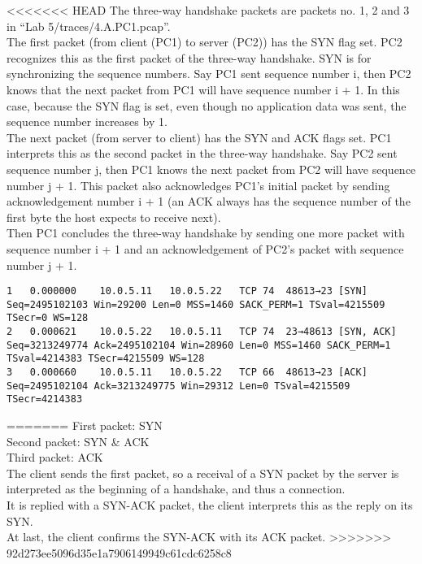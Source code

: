 <<<<<<< HEAD
The three-way handshake packets are packets no. 1, 2 and 3 in ``Lab 5/traces/4.A.PC1.pcap''. \\
The first packet (from client (PC1) to server (PC2)) has the SYN flag set. PC2 recognizes this as the first packet of the three-way handshake. SYN is for synchronizing the sequence numbers. Say PC1 sent sequence number i, then PC2 knows that the next packet from PC1 will have sequence number i + 1. In this case, because the SYN flag is set, even though no application data was sent, the sequence number increases by 1. \\
The next packet (from server to client) has the SYN and ACK flags set. PC1 interprets this as the second packet in the three-way handshake. Say PC2 sent sequence number j, then PC1 knows the next packet from PC2 will have sequence number j + 1. This packet also acknowledges PC1's initial packet by sending acknowledgement number i + 1 (an ACK always has the sequence number of the first byte the host expects to receive next). \\
Then PC1 concludes the three-way handshake by sending one more packet with sequence number i + 1 and an acknowledgement of PC2's packet with sequence number j + 1.

\begin{lstlisting}
1	0.000000	10.0.5.11	10.0.5.22	TCP	74	48613→23 [SYN] Seq=2495102103 Win=29200 Len=0 MSS=1460 SACK_PERM=1 TSval=4215509 TSecr=0 WS=128
2	0.000621	10.0.5.22	10.0.5.11	TCP	74	23→48613 [SYN, ACK] Seq=3213249774 Ack=2495102104 Win=28960 Len=0 MSS=1460 SACK_PERM=1 TSval=4214383 TSecr=4215509 WS=128
3	0.000660	10.0.5.11	10.0.5.22	TCP	66	48613→23 [ACK] Seq=2495102104 Ack=3213249775 Win=29312 Len=0 TSval=4215509 TSecr=4214383
\end{lstlisting}
=======
First packet: SYN \\
Second packet: SYN \& ACK \\
Third packet: ACK \\

The client sends the first packet, so a receival of a SYN packet by the server is interpreted as the beginning of a handshake, and thus a connection.\\
It is replied with a SYN-ACK packet, the client interprets this as the reply on its SYN.\\
At last, the client confirms the SYN-ACK with its ACK packet.
>>>>>>> 92d273ee5096d35e1a7906149949c61cdc6258c8
